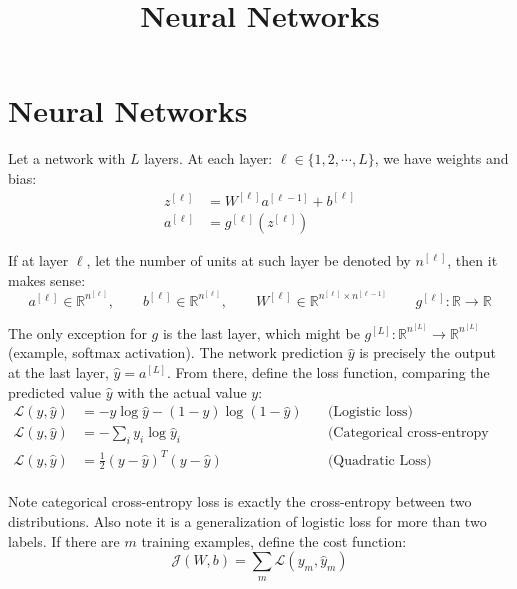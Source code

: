 \documentclass[a4paper, 12pt]{report}
\begin{document}
\title{Neural Networks}
\maketitle

\section{Neural Networks}
Let a network with $L$ layers. At each layer: $\ell\in\{1, 2, \cdots, L\}$, we have weights and bias:
\begin{equation}
\begin{array}{ll}
z^{[\ell]} &= W^{[\ell]} a^{[\ell-1]} + b^{[\ell]} \\
a^{[\ell]} &= g^{[\ell]}(z^{[\ell]})
\end{array}
\end{equation}

If at layer $\ell$, let the number of units at such layer be denoted by $n^{[\ell]}$, then it makes sense:
\begin{equation}
a^{[\ell]}\in\mathbb{R}^{n^{[\ell]}},\quad\quad
b^{[\ell]}\in\mathbb{R}^{n^{[\ell]}},\quad\quad
W^{[\ell]}\in\mathbb{R}^{n^{[\ell]}\times n^{[\ell-1]}}\quad\quad
g^{[\ell]}: \mathbb{R}\to\mathbb{R}
\end{equation}

The only exception for $g$ is the last layer, which might be $g^{[L]}: \mathbb{R}^{n^{[L]}}\to\mathbb{R}^{n^{[L]}}$ (example, softmax activation).
The network prediction $\hat y$ is precisely the output at the last layer, $\hat y = a^{[L]}$. From there, define the loss function, comparing the predicted value $\hat y$ with the actual value $y$:
\begin{equation}
\begin{array}{lll}
\mathcal L(y, \hat y) &= -y\log\hat y - (1-y)\log(1-\hat y)\quad&\text{(Logistic loss)} \\
\mathcal L(y, \hat y) &= -\sum_i y_i\log\hat y_i\quad&\text{(Categorical cross-entropy loss)} \\
\mathcal L(y, \hat y) &= \frac{1}{2}(y-\hat y)^T(y-\hat y)&\text{(Quadratic Loss)} \\
\end{array}
\end{equation}

Note categorical cross-entropy loss is exactly the cross-entropy between two distributions. Also note it is a generalization of logistic loss for more than two labels. If there are $m$ training examples, define the cost function:
\begin{equation}
\mathcal J(W,b) = \sum_m\mathcal L(y_m, \hat y_m)
\end{equation}
\end{document}
